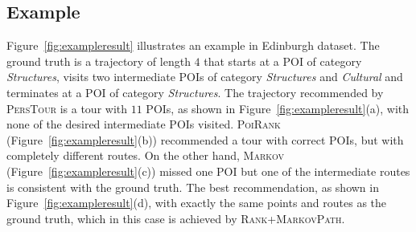 \subsection{Example}
\label{sec:example}
\secmoveup



Figure~\ref{fig:exampleresult} illustrates an example %
in Edinburgh dataset.
The ground truth is a trajectory of length $4$ that starts at a POI of category \textit{Structures},
visits two intermediate POIs of category \textit{Structures} and \textit{Cultural} and
terminates at a POI of category \textit{Structures}.
The trajectory recommended by \textsc{PersTour} is a tour with $11$ POIs, as shown in Figure~\ref{fig:exampleresult}(a),
with none of the desired intermediate POIs visited.
\textsc{PoiRank} (Figure~\ref{fig:exampleresult}(b)) recommended a tour with correct POIs,
but with completely different routes.
On the other hand, \textsc{Markov} (Figure~\ref{fig:exampleresult}(c)) missed one POI 
but one of the intermediate routes is consistent with the ground truth.
The best recommendation, as shown in Figure~\ref{fig:exampleresult}(d), 
with exactly the same points and routes as the ground truth,
which in this case is achieved by \textsc{Rank+MarkovPath}.
